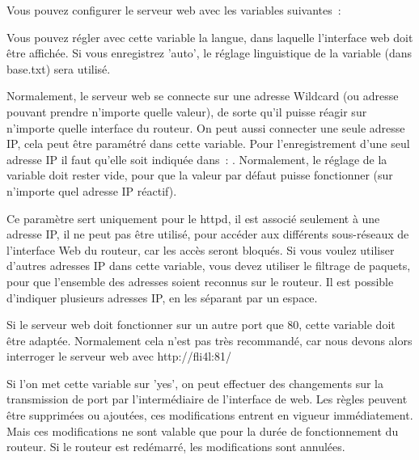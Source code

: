    Vous pouvez configurer le serveur web avec les variables suivantes~:

\begin{description}


    {Vous pouvez régler avec cette variable la langue, dans laquelle
    l'interface web doit être affichée. Si vous enregistrez 'auto', le réglage
    linguistique de la variable  (dans base.txt) sera utilisé.}


    Normalement, le serveur web se connecte sur une adresse Wildcard (ou adresse
    pouvant prendre n'importe quelle valeur), de sorte qu'il puisse réagir sur
    n'importe quelle interface du routeur. On peut aussi connecter une seule
    adresse IP, cela peut être paramétré dans cette variable. Pour l'enregistrement
    d'une seul adresse IP il faut qu'elle soit indiquée dans~: .
    Normalement, le réglage de la variable doit rester vide, pour que la valeur
    par défaut puisse fonctionner (sur n'importe quel adresse IP réactif).

    Ce paramètre sert uniquement pour le httpd, il est associé seulement à une
    adresse IP, il ne peut pas être utilisé, pour accéder aux différents
    sous-réseaux de l'interface Web du routeur, car les accès seront bloqués.
    Si vous voulez utiliser d'autres adresses IP dans cette variable, vous devez
    utiliser le filtrage de paquets, pour que l'ensemble des adresses soient
    reconnus sur le routeur. Il est possible d'indiquer plusieurs adresses IP,
    en les séparant par un espace.


    {Si le serveur web doit fonctionner sur un autre port que 80, cette variable
    doit être adaptée. Normalement cela n'est pas très recommandé, car nous
    devons alors interroger le serveur web avec http://fli4l:81/}


    {Si l'on met cette variable sur 'yes', on peut effectuer des changements
    sur la transmission de port par l'intermédiaire de l'interface de web. Les
    règles peuvent être supprimées ou ajoutées, ces modifications entrent en
    vigueur immédiatement. Mais ces modifications ne sont valable que pour la
    durée de fonctionnement du routeur. Si le routeur est redémarré,
    les modifications sont annulées.

}
\end{description}
